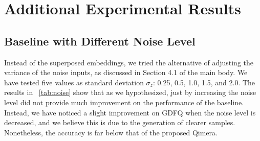 \documentclass{article}
\newcommand{\aname}{Qimera\xspace}
\begin{document}
\section{Additional Experimental Results}



\subsection{Baseline with Different Noise Level}

Instead of the superposed embeddings, we tried the alternative of adjusting the variance of the noise inputs, as discussed in Section 4.1 of the main body.
We have tested five values as standard deviation $\sigma_z$: 0.25, 0.5, 1.0, 1.5, and 2.0.
The results in \tablename~\ref{tab:noise} show that as we hypothesized, just by increasing the noise level did not provide much improvement on the performance of the baseline.
Instead, we have noticed a slight improvement on GDFQ when the noise level is decreased, and we believe this is due to the generation of clearer samples. 
Nonetheless, the accuracy is far below that of the proposed \aname.
\end{document}
